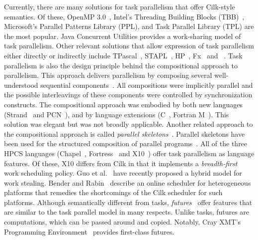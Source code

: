 \documentclass{sig-alternate}
\begin{document}
Currently, there are many solutions for task parallelism that offer Cilk-style
semantics.  Of these, OpenMP 3.0~\cite{kn:omp_30}, Intel's Threading Building
Blocks (TBB)~\cite{kn:tbb}, Microsoft's Parallel Patterns Library (PPL), and
Task Parallel Library (TPL) are the most popular. 
Java Concurrent Utilities provides a work-sharing model of task parallelism.
Other relevant solutions that allow expression of task parallelism either
directly or indirectly include TPascal~\cite{Ansgar:1996},
STAPL~\cite{AnSTAPL01a, AnSTAPL01b}, HP\Cpp{}~\cite{gannon:hpc},
Fx~\cite{Gross:1994} and \Charmpp{}~\cite{Kale93charm++:a}.
Task parallelism is also the design principle behind the compositional approach
to parallelism. This approach delivers parallelism by composing several
well-understood sequential components~\cite{Foster:1996p14161,
Abadi:1993p12637,Juan:1998p13476}. All compositions were implicitly parallel
and the possible interleavings of these components were controlled by
synchronization constructs. The compositional approach was embodied by both 
new languages (Strand~\cite{Foster:2008p806} and PCN~\cite{Foster:1996p14161}),
and by language extensions (C\Cpp~\cite{Chandy:1993p14898}, Fortran
M~\cite{Foster:1993p1441}).  This solution was elegant but was not broadly
applicable. 
Another related approach to the compositional approach is called
\textit{parallel skeletons}~\cite{darlington93parallel,
boiten-transformational,
Cole:2004p14559,Kuchen:2002p14936,Bacci:1999p14920,Cole:1989p14916}. Parallel
skeletons have been used for the structured composition of parallel
programs~\cite{Darlington:1995p14933}. 
All of the three HPCS languages (Chapel~\cite{Chamberlain:2007p1040},
Fortress~\cite{fortress} and X10~\cite{Charles:2005p1232}) offer task
parallelism as language features. Of these, X10 differs from Cilk in that it
implements a \textit{breadth-first}~\cite{Cong08} work scheduling policy. Guo
et al.~\cite{Sarkar09} have recently proposed a hybrid model for work 
stealing. 
%
Bender and Rabin~\cite{BenderRa02} describe an online scheduler for
heterogeneous platforms that remedies the shortcomings of the Cilk scheduler 
for such platforms.
Although semantically different from tasks, \textit{futures}~\cite{Halstead85}
offer features that are similar to the task parallel model in many respects.
Unlike tasks, futures are computations, which can be passed around and copied.
Notably, Cray XMT's Programming Environment~\cite{cray} provides first-class
futures.
\end{document}
